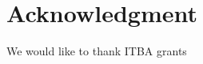 \documentclass[conference]{IEEEtran}
\begin{document}
%
%
%
%

\section*{Acknowledgment}

We would like to thank ITBA grants




\end{document}

